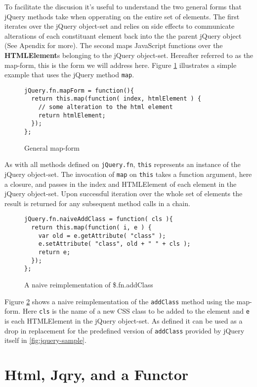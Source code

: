 \documentclass[preprint,10pt]{sigplanconf}
\begin{document}
To facilitate the discusion it's useful to understand the two general forms that jQuery methods take when opperating on the entire set of elements. The first iterates over the jQuery object-set and relies on side effects to communicate alterations of each constituant element back into the the parent jQuery object (See Apendix for more). The second maps JavaScript functions over the \textbf{HTMLElement}s belonging to the jQuery object-set. Hereafter referred to as the map-form, this is the form we will address here. Figure \ref{fig:map-form} illustrates a simple example that uses the jQuery method \verb|map|.

\begin{figure}[h!]
\small
\begin{verbatim}
jQuery.fn.mapForm = function(){
  return this.map(function( index, htmlElement ) {
    // some alteration to the html element
    return htmlElement;
  });
};
\end{verbatim}
\nocaptionrule \caption{General map-form}
\label{fig:map-form}
\end{figure}

As with all methods defined on \verb|jQuery.fn|, \verb|this| represents an instance of the jQuery object-set. The invocation of \verb|map| on \verb|this| takes a function argument, here a closure, and passes in the index and HTMLElement of each element in the jQuery object-set. Upon successful iteration over the whole set of elements the result is returned for any subsequent method calls in a chain.

\begin{figure}[h!]
\small
\begin{verbatim}
jQuery.fn.naiveAddClass = function( cls ){
  return this.map(function( i, e ) {
    var old = e.getAttribute( "class" );
    e.setAttribute( "class", old + " " + cls );
    return e;
  });
};
\end{verbatim}
\nocaptionrule \caption{A naive reimplementation of \$.fn.addClass}
\label{fig:naive-add-class}
\end{figure}

Figure \ref{fig:naive-add-class} shows a naive reimplementation of the \verb|addClass| method using the map-form. Here \verb|cls| is the name of a new CSS class to be added to the element and \verb|e| is each HTMLElement in the jQuery object-set. As defined it can be used as a drop in replacement for the predefined version of \verb|addClass| provided by jQuery itself in \ref{fig:jquery-sample}.

\section{Html, Jqry, and a Functor}
\end{document}

